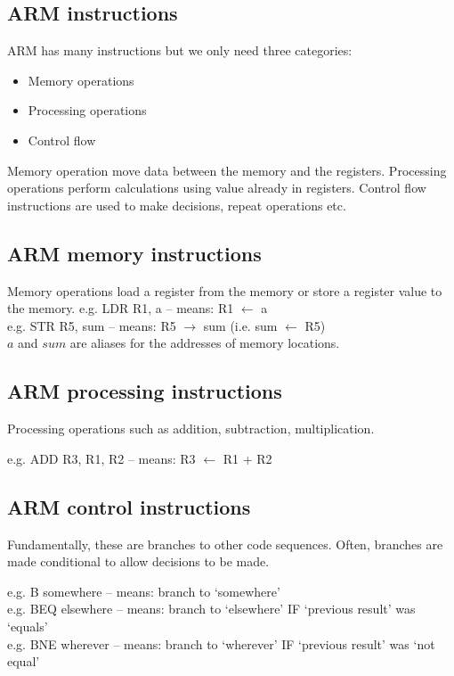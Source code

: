 \documentclass{article} %
\begin{document}
\subsection{ARM instructions}
ARM has many instructions but we only need three categories:
\begin{itemize}
	\item Memory operations
	\item Processing operations
	\item Control flow
\end{itemize}
Memory operation move data between the memory and the registers. Processing operations perform calculations using value already in registers. Control flow instructions are used to make decisions, repeat operations etc.

\subsection{ARM memory instructions}
Memory operations load a register from the memory or store a register value to the memory.
e.g. LDR R1, a – means: R1 \(\leftarrow\) a\\
e.g. STR R5, sum – means: R5 \(\rightarrow\) sum (i.e. sum \(\leftarrow\) R5)\\

$a$ and $sum$ are aliases for the addresses of memory locations.

\subsection{ARM processing instructions}
Processing operations such as addition, subtraction, multiplication.

e.g. ADD R3, R1, R2 – means: R3 \(\leftarrow\) R1 + R2

\subsection{ARM control instructions}
Fundamentally, these are branches to other code sequences. Often, branches are made conditional to allow decisions to be made.

e.g. B somewhere – means: branch to ‘somewhere’\\
e.g. BEQ elsewhere – means: branch to ‘elsewhere’ IF ‘previous result’ was ‘equals’\\
e.g. BNE wherever – means: branch to ‘wherever’ IF ‘previous result’ was ‘not equal’\\
\end{document}
